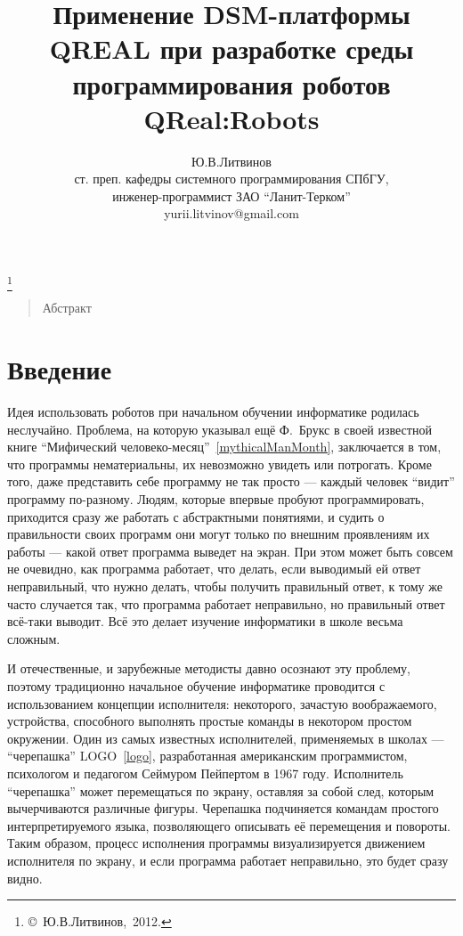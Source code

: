 \documentclass[a4paper]{article}
\title{Применение DSM-платформы QREAL при разработке среды программирования роботов QReal:Robots}
\author{Ю.В.Литвинов \\ ст. преп. кафедры системного программирования СПбГУ, \\ инженер-программист ЗАО ``Ланит-Терком'' \\ yurii.litvinov@gmail.com}
\date{}
\begin{document}
\maketitle
\thispagestyle{empty}

\renewcommand{\thefootnote}{}
\footnote{\small{\copyright~Ю.В.Литвинов,~2012.}}
\renewcommand{\thefootnote}{\arabic{footnote}}
\setcounter{footnote}{0}

\begin{quote}
\small\noindent
Абстракт
\end{quote}

\section*{Введение}
Идея использовать роботов при начальном обучении информатике родилась неслучайно. Проблема, на которую указывал ещё Ф.~Брукс в своей известной книге ``Мифический человеко-месяц''~\ref{mythicalManMonth}, заключается в том, что программы нематериальны, их невозможно увидеть или потрогать. Кроме того, даже представить себе программу не так просто --- каждый человек ``видит'' программу по-разному. Людям, которые впервые пробуют программировать, приходится сразу же работать с абстрактными понятиями, и судить о правильности своих программ они могут только по внешним проявлениям их работы --- какой ответ программа выведет на экран. При этом может быть совсем не очевидно, как программа работает, что делать, если выводимый ей ответ неправильный, что нужно делать, чтобы получить правильный ответ, к тому же часто случается так, что программа работает неправильно, но правильный ответ всё-таки выводит. Всё это делает изучение информатики в школе весьма сложным.

И отечественные, и зарубежные методисты давно осознают эту проблему, поэтому традиционно начальное обучение информатике проводится с использованием концепции исполнителя: некоторого, зачастую воображаемого, устройства, способного выполнять простые команды в некотором простом окружении. Один из самых известных исполнителей, применяемых в школах --- ``черепашка'' LOGO~\ref{logo}, разработанная американским программистом, психологом и педагогом Сеймуром Пейпертом в 1967 году. Исполнитель ``черепашка'' может перемещаться по экрану, оставляя за собой след, которым вычерчиваются различные фигуры. Черепашка подчиняется командам простого интерпретируемого языка, позволяющего описывать её перемещения и повороты. Таким образом, процесс исполнения программы визуализируется движением исполнителя по экрану, и если программа работает неправильно, это будет сразу видно. 
\end{document}
